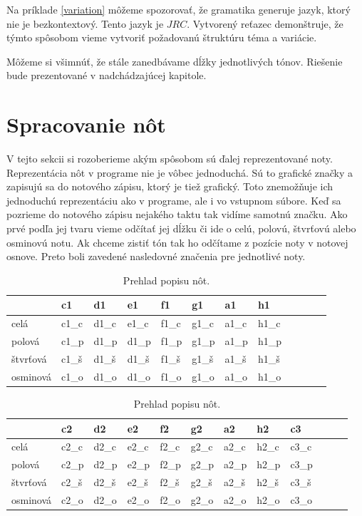 Na príklade \ref{variation} môžeme spozorovať, že gramatika generuje jazyk, ktorý nie je bezkontextový. Tento jazyk je $JRC$. Vytvorený reťazec demonštruje, že týmto spôsobom vieme vytvoriť požadovanú štruktúru téma a variácie.

Môžeme si všimnúť, že stále zanedbávame dĺžky jednotlivých tónov. Riešenie bude prezentované v nadchádzajúcej kapitole.

\section{Spracovanie nôt}
V tejto sekcii si rozoberieme akým spôsobom sú ďalej reprezentované noty. Reprezentácia nôt v programe nie je vôbec jednoduchá. Sú to grafické značky a zapisujú sa do notového zápisu, ktorý je tiež grafický. Toto znemožňuje ich jednoduchú reprezentáciu ako v programe, ale i vo vstupnom súbore. Keď sa pozrieme do notového zápisu nejakého taktu tak vidíme samotnú značku. Ako prvé podľa jej tvaru vieme odčítať jej dĺžku či ide o celú, polovú, štvrťovú alebo osminovú notu. Ak chceme zistiť tón tak ho odčítame z pozície noty v notovej osnove. Preto boli zavedené nasledovné značenia pre jednotlivé noty.

\begin{table}[!ht]
\label{tab:tone}
    \centering
    \begin{tabular}{|l|l|l|l|l|l|l|l|l|l|l|l}
    \hline
        ~ & c1 & d1 & e1 & f1 & g1 & a1 & h1 \\ \hline
        celá & c1\_c & d1\_c & e1\_c & f1\_c & g1\_c & a1\_c & h1\_c \\ \hline
        polová & c1\_p & d1\_p & d1\_p & f1\_p & g1\_p & a1\_p & h1\_p \\ \hline
        štvrťová & c1\_š & d1\_š & d1\_š & f1\_š & g1\_š & a1\_š & h1\_š \\ \hline
        osminová & c1\_o & d1\_o & d1\_o & f1\_o & g1\_o & a1\_o & h1\_o  \\ \hline
    \end{tabular}
    \caption{\label{tab:notes} Prehlad popisu nôt.}
\end{table}
\begin{table}[!ht]
    \centering
    \begin{tabular}{|l|l|l|l|l|l|l|l|l|l|l|l}
    \hline
        ~ & c2 & d2 & e2 & f2 & g2 & a2 & h2 & c3 \\ \hline
        celá & c2\_c & d2\_c & e2\_c & f2\_c & g2\_c & a2\_c & h2\_c & c3\_c \\ \hline
        polová & c2\_p & d2\_p & e2\_p & f2\_p & g2\_p & a2\_p & h2\_p & c3\_p \\ \hline
        štvrťová & c2\_š & d2\_š & e2\_š & f2\_š & g2\_š & a2\_š & h2\_š & c3\_š \\ \hline
        osminová & c2\_o & d2\_o & e2\_o & f2\_o & g2\_o & a2\_o & h2\_o & c3\_o \\ \hline
    \end{tabular}
    \caption{\label{tab:notes1} Prehlad popisu nôt.}
\end{table}


